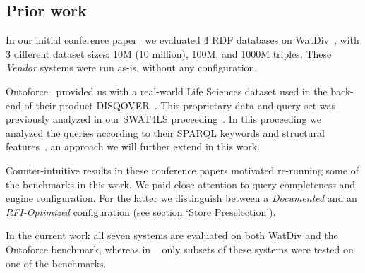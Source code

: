 
\subsection{Prior work}

In our initial conference paper~\cite{de2016big} we evaluated 4 RDF databases on WatDiv~\cite{alucc2014diversified}, with 3 different dataset sizes: 10M (10 million), 100M, and 1000M triples. These \emph{Vendor} systems were run as-is, without any configuration. 

Ontoforce~\cite{ontoforcewebsite} provided us with a real-world Life \mbox{Sciences} dataset used in the back-end of their product \mbox{DISQOVER~\cite{disqover}}. This proprietary data and query-set was previously analyzed in our SWAT4LS proceeding~\cite{dewitte_swat4ls_2016}.
In this proceeding we analyzed the queries according to their SPARQL keywords and structural features~\cite{DBLP:journals/corr/abs-1103-5043}, an approach we will further extend in this work. 

Counter-intuitive results in these conference papers motivated re-running some of the benchmarks in this work. We paid close attention to query completeness and engine configuration. For the latter we distinguish between a \emph{Documented} and an \emph{RFI-Optimized} configuration (see section `Store Preselection'). 

In the current work all seven systems are evaluated on both WatDiv and the Ontoforce benchmark, whereas in ~\cite{de2016big,dewitte_swat4ls_2016} only subsets of these systems were tested on one of the benchmarks.


